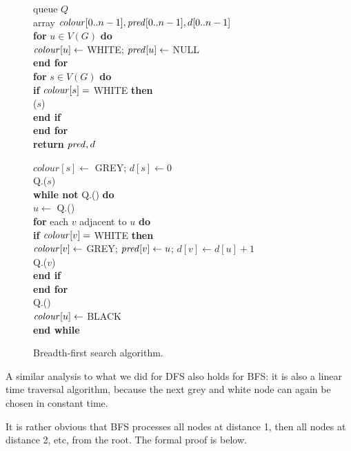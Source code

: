 \begin{figure}[hbtp]


{
\> queue $Q$ \\
\> array $\operatorname{\text{\textit{colour}}}[0..n-1], \operatorname{\text{\textit{pred}}}[0..n-1], d[0..n-1]$ \\
\> \textbf{for} $u \in V(G)$ \textbf{do} \\
\> \> $\operatorname{\text{\textit{colour}}}[u] \gets $ WHITE; $\operatorname{\text{\textit{pred}}}[u] \gets $ NULL \\
\> \textbf{end for}\\
\> \textbf{for}  $s\in V(G)$ \textbf{do} \\
\> \> \textbf{if} $\operatorname{\text{\textit{colour}}}[s] = $ WHITE \textbf{then} \\
\> \> \> ($s$) \\
\> \> \textbf{end if}\\
\> \textbf{end for}\\
\> \textbf{return} $\operatorname{\text{\textit{pred}}}, d$\\
}

{
\> $colour[s] \gets $ GREY; $d[s] \gets 0$ \\
\> Q.($s$) \\
\> \textbf{while not} Q.() \textbf{do} \\
\> \> $u \gets $ Q.() \\
\> \> \textbf{for} each $v$ adjacent to $u$ \textbf{do} \\
\> \> \> \textbf{if} $\operatorname{\text{\textit{colour}}}[v] = $ WHITE \textbf{then} \\
\> \> \> \> $\operatorname{\text{\textit{colour}}}[v] \gets $ GREY; $\operatorname{\text{\textit{pred}}}[v] \gets u$; $d[v] \gets d[u]+1$\\
\> \> \> \> Q.($v$) \\
\> \> \> \textbf{end if} \\
\> \> \textbf{end for} \\
\> \> Q.() \\
\> \> $\operatorname{\text{\textit{colour}}}[u] \gets $ BLACK \\
\> \textbf{end while} \\
}

\caption{Breadth-first search algorithm.}
\label{fig:BFScode}
\end{figure}


A similar analysis to what we did for DFS also holds for BFS: it is also
a linear time traversal algorithm, because the next grey and white node 
can again be chosen in constant time.

It is rather obvious that BFS processes all nodes at distance 1, then
all nodes at distance 2, etc, from the root. The formal proof is below.

